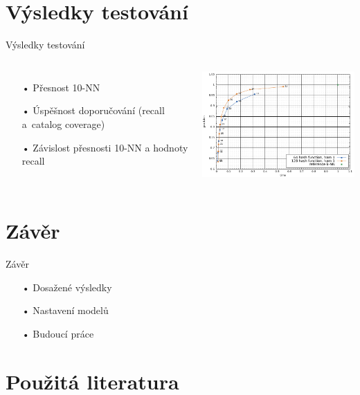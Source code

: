 \documentclass[aspectratio=169,28pt]{beamer}
\begin{document}
\section{Výsledky testování}
\begin{frame}{Výsledky testování}
\begin{columns}[c]
    \column{7cm}
      \begin{itemize}
		\item[•] Přesnost 10-NN
		\item[•] Úspěšnost doporučování (recall a~catalog coverage)
		\item[•] Závislost přesnosti 10-NN a hodnoty recall
		\end{itemize}
    \column{8cm}
      \center\center\includegraphics[width=8cm]{img/modKNNopt}
  \end{columns}
		
\end{frame}

\section{Závěr}
\begin{frame}{Závěr}
		\begin{itemize}
		\item[•] Dosažené výsledky
		\item[•] Nastavení modelů
		\item[•] Budoucí práce
		\end{itemize}
\end{frame}

\section{Použitá literatura}
\end{document}
